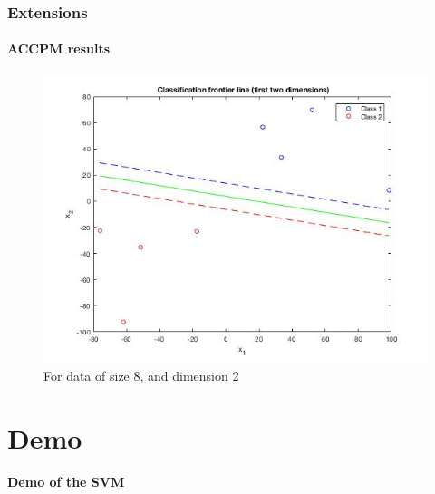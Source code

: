 \documentclass{beamer}
\begin{document}
\begin{frame}
\frametitle{Extensions}
\framesubtitle{ACCPM results}

\begin{figure}
\caption{For data of size 8, and dimension 2}
\includegraphics[scale=0.4]{images/accpmtestfig.jpg}
\end{figure}

\end{frame}

\section{Demo}

\begin{frame}
\tableofcontents[currentsection]
\end{frame}

\begin{frame}

\bigskip

\bigskip

\begin{center}
\textbf{Demo of the SVM}
\end{center}

\end{frame}
\end{document}

